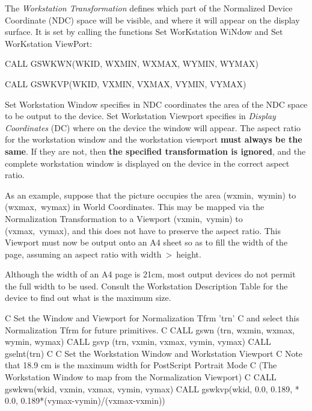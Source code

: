 The {\it Workstation Transformation} defines which part of the
Normalized Device Coordinate (NDC) space will
be visible, and where it will appear on the display surface.
It is set by calling the functions Set WorKstation WiNdow and
Set WorKstation ViewPort:
\begin{XMP}
CALL GSWKWN(WKID, WXMIN, WXMAX, WYMIN, WYMAX)
 
CALL GSWKVP(WKID, VXMIN, VXMAX, VYMIN, VYMAX)
\end{XMP}
Set Workstation Window specifies in NDC coordinates the area of the NDC
space to be output to the device. Set Workstation Viewport specifies in
{\it Display Coordinates} (DC) where on the device the window will appear.
The aspect ratio for the workstation window and the workstation viewport
{\bf must always be the same}.
If they are not, then {\bf the specified transformation is ignored},
and the complete workstation window is displayed on the device
in the correct aspect ratio.
 
As an example, suppose that the picture occupies the area (wxmin,~wymin)
to (wxmax,~wymax) in World Coordinates. This may be mapped via the
Normalization Transformation to a Viewport (vxmin,~vymin) to
(vxmax,~vymax), and this does not have to preserve the aspect ratio.
This Viewport must now be output onto an A4 sheet so as to fill the width
of the page, assuming an aspect ratio with width~>~height.
\begin{note}
Although the width of an A4 page is 21cm, most output devices do not
permit the full width to be used. Consult the Workstation Description Table
for the device to find out what is the maximum size.
\end{note}
\begin{XMP}
C  Set the Window and Viewport for Normalization Tfrm 'trn'
C  and select this Normalization Tfrm for future primitives.
C
      CALL gswn  (trn,  wxmin, wxmax, wymin, wymax)
      CALL gsvp  (trn,  vxmin, vxmax, vymin, vymax)
      CALL gselnt(trn)
C
C  Set the Workstation Window and Workstation Viewport
C  Note that 18.9 cm is the maximum width for PostScript Portrait Mode
C  (The Workstation Window to map from the Normalization Viewport)
C
      CALL gswkwn(wkid, vxmin, vxmax, vymin, vymax)
      CALL gswkvp(wkid, 0.0,   0.189,
     *                  0.0,   0.189*(vymax-vymin)/(vxmax-vxmin))
\end{XMP}
